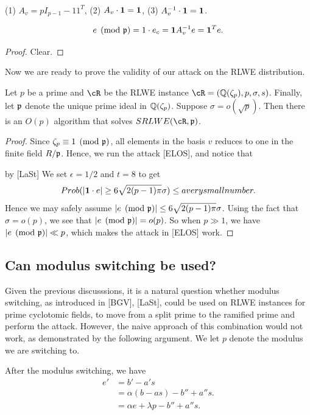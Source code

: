 \documentclass{amsart}
\begin{document}
\begin{Lemma} \qquad \\
(1) $A_v = pI_{p-1} - 11^T$,
(2) $A_v \cdot {\bf 1} = {\bf 1}$,
(3) $A_v^{-1} \cdot {\bf 1} = {\bf 1}$.
\end{Lemma}

\begin{Lemma}
\[
e\pmod{\mathfrak{p}} = 1 \cdot e_c = {\bf 1} A_v^{-1} e = {\bf 1}^T e.
\]
\end{Lemma}
\begin{proof}
Clear.
\end{proof}

Now we are ready to prove the validity of our attack on the
RLWE distribution.
\begin{theorem}
Let $p$ be a prime and $\cR$ be the RLWE instance $\cR = (\bQ(\zeta_p), p,\sigma,s)$. Finally, let $\mathfrak{p}$ denote the unique prime ideal in $\mathbb{Q}(\zeta_p)$. Suppose $\sigma = o(\sqrt{p})$. Then there is an $O(p)$ algorithm that solves $SRLWE(\cR,\fp)$.
\end{theorem}

\begin{proof}
Since $\zeta_p \equiv 1 \pmod{\mathfrak{p}}$, all elements in the basis $v$ reduces to one in the finite field $R/\mathfrak{p}$. Hence, we run the attack [ELOS], and notice that

by [LaSt] We set $\epsilon = 1/2$ and $t  = 8$ to get
\[
Prob(|{\bf 1} \cdot e| \geq 6\sqrt{2(p-1)\pi} \sigma) \leq a very small number.
\]
Hence we may safely assume
$|e \pmod{\mathfrak{p}}|\leq 6\sqrt{2(p-1)\pi} \sigma$. Using the fact that $\sigma = o(p)$, we see that $|e \pmod{\mathfrak{p}}| = o(p)$. So when $p \gg 1$, we have  $|e \pmod{\mathfrak{p}}| \ll p$, which makes the attack in [ELOS] work.
\end{proof}

\subsection{Can modulus switching be used?}

Given the previous discusssions, it is a natural question whether modulus switching, as introduced in [BGV], [LaSt],
could be used on RLWE instances for prime cyclotomic fields, to move from a split prime to the ramified prime and perform the attack. However, the naive approach of this combination would not work, as demonstrated by the following argument.
We let $p$ denote the modulus we are switching to.

After the modulus switching, we have
\begin{align*}
    e' &= b' - a's  \\
    &= \alpha(b-as) - b''  + a''s. \\
    & = \alpha e + \lambda p - b'' + a''s.
\end{align*}
\end{document}

